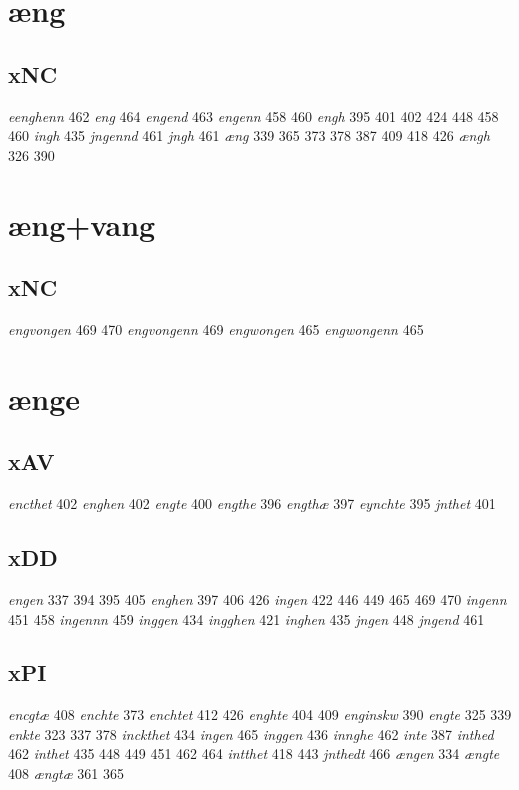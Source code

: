 \documentclass[a4paper,twocolumn]{article}
\begin{document}
\section{æng}
\label{sec:orgf6b63a3}
\subsection{xNC}
\label{sec:orgd1745ae}
\emph{eenghenn} 462 \emph{eng} 464 \emph{engend} 463 \emph{engenn} 458 460 \emph{engh} 395 401 402 424 448 458 460 \emph{ingh} 435 \emph{jngennd} 461 \emph{jngh} 461 \emph{æng} 339 365 373 378 387 409 418 426 \emph{ængh} 326 390 
\section{æng+vang}
\label{sec:org960396b}
\subsection{xNC}
\label{sec:orgf355a6e}
\emph{engvongen} 469 470 \emph{engvongenn} 469 \emph{engwongen} 465 \emph{engwongenn} 465 
\section{ænge}
\label{sec:org7c372b8}
\subsection{xAV}
\label{sec:orgf54091a}
\emph{encthet} 402 \emph{enghen} 402 \emph{engte} 400 \emph{engthe} 396 \emph{engthæ} 397 \emph{eynchte} 395 \emph{jnthet} 401 
\subsection{xDD}
\label{sec:org27550a0}
\emph{engen} 337 394 395 405 \emph{enghen} 397 406 426 \emph{ingen} 422 446 449 465 469 470 \emph{ingenn} 451 458 \emph{ingennn} 459 \emph{inggen} 434 \emph{ingghen} 421 \emph{inghen} 435 \emph{jngen} 448 \emph{jngend} 461 
\subsection{xPI}
\label{sec:org4631e2c}
\emph{encgtæ} 408 \emph{enchte} 373 \emph{enchtet} 412 426 \emph{enghte} 404 409 \emph{enginskw} 390 \emph{engte} 325 339 \emph{enkte} 323 337 378 \emph{inckthet} 434 \emph{ingen} 465 \emph{inggen} 436 \emph{innghe} 462 \emph{inte} 387 \emph{inthed} 462 \emph{inthet} 435 448 449 451 462 464 \emph{intthet} 418 443 \emph{jnthedt} 466 \emph{ængen} 334 \emph{ængte} 408 \emph{ængtæ} 361 365 
\end{document}
